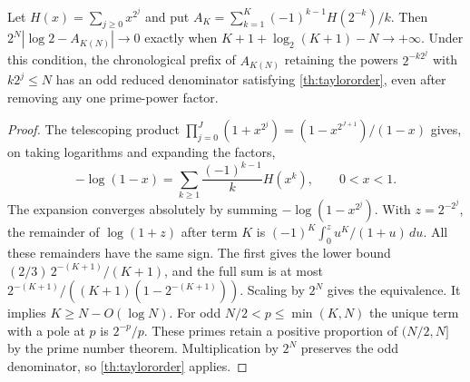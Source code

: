 \documentclass[11pt]{article}
\begin{document}
\begin{proposition}\label{prop:signed}
Let $H(x)=\sum_{j\ge0}x^{2^j}$ and put $A_K=\sum_{k=1}^K(-1)^{k-1}H(2^{-k})/k$. Then $2^N|\log 2-A_{K(N)}|\to0$ exactly when $K+1+\log_2(K+1)-N\to+\infty$. Under this condition, the chronological prefix of $A_{K(N)}$ retaining the powers $2^{-k2^j}$ with $k2^j\le N$ has an odd reduced denominator satisfying \cref{th:taylororder}, even after removing any one prime-power factor.
\end{proposition}
\begin{proof}
The telescoping product $\prod_{j=0}^J(1+x^{2^j})=(1-x^{2^{J+1}})/(1-x)$ gives, on taking logarithms and expanding the factors,
\[
 -\log(1-x)=\sum_{k\ge1}\frac{(-1)^{k-1}}k H(x^k),\qquad 0<x<1.
\]
The expansion converges absolutely by summing $-\log(1-x^{2^j})$. With $z=2^{-2^j}$, the remainder of $\log(1+z)$ after term $K$ is $(-1)^K\int_0^z u^K/(1+u)\,du$. All these remainders have the same sign. The first gives the lower bound $(2/3)\,2^{-(K+1)}/(K+1)$, and the full sum is at most $2^{-(K+1)}/((K+1)(1-2^{-(K+1)}))$. Scaling by $2^N$ gives the equivalence. It implies $K\ge N-O(\log N)$. For odd $N/2<p\le\min(K,N)$ the unique term with a pole at $p$ is $2^{-p}/p$. These primes retain a positive proportion of $(N/2,N]$ by the prime number theorem. Multiplication by $2^N$ preserves the odd denominator, so \cref{th:taylororder} applies.
\end{proof}
\end{document}

